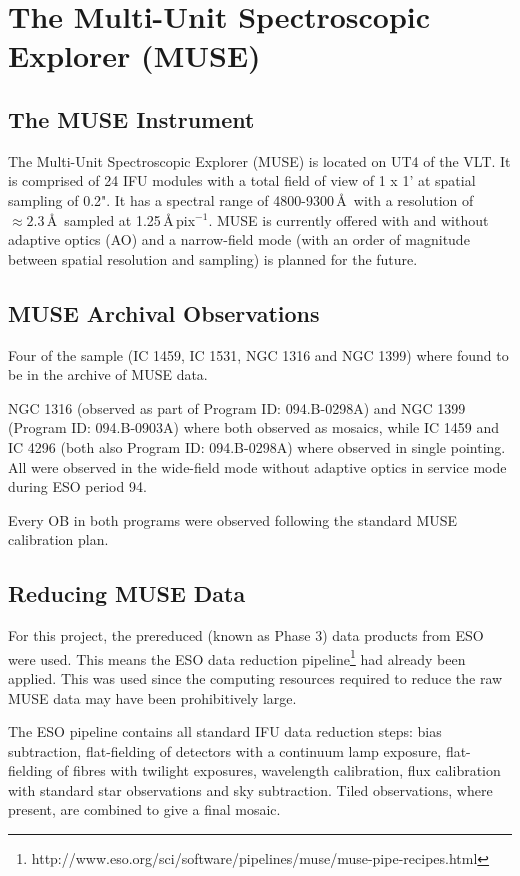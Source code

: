 \section{The Multi-Unit Spectroscopic Explorer (MUSE)}
	\label{sec:MUSE}
	\subsection{The MUSE Instrument}
		The Multi-Unit Spectroscopic Explorer (MUSE) is located on UT4 of the VLT. It is comprised of 24 IFU modules with a total field of view of 1 x 1' at spatial sampling of 0.2". It has a spectral range of 4800-9300\,\AA\ with a resolution of $\approx 2.3$\,\AA\ sampled at 1.25\,\AA\,pix$^{-1}$. MUSE is currently offered with and without adaptive optics (AO) and a narrow-field mode (with an order of magnitude between spatial resolution and sampling) is planned for the future. 
		
	\subsection{MUSE Archival Observations}
		Four of the sample (IC 1459, IC 1531, NGC 1316 and NGC 1399) where found to be in the archive of MUSE data.

		NGC 1316 (observed as part of Program ID: 094.B-0298A) and NGC 1399 (Program ID: 094.B-0903A) where both observed as mosaics, while IC 1459 and IC 4296 (both also Program ID: 094.B-0298A) where observed in single pointing. All were observed in the wide-field mode without adaptive optics in service mode during ESO period 94. 

		Every OB in both programs were observed following the standard MUSE calibration plan.

	\subsection{Reducing MUSE Data}
		For this project, the prereduced (known as Phase 3) data products from ESO were used. This means the ESO data reduction pipeline\footnote{http://www.eso.org/sci/software/pipelines/muse/muse-pipe-recipes.html} had already been applied. This was used since the computing resources required to reduce the raw MUSE data may have been prohibitively large.

		The ESO pipeline contains all standard IFU data reduction steps: bias subtraction, flat-fielding of detectors with a continuum lamp exposure, flat-fielding of fibres with twilight exposures, wavelength calibration, flux calibration with standard star observations and sky subtraction. Tiled observations, where present, are combined to give a final mosaic.

